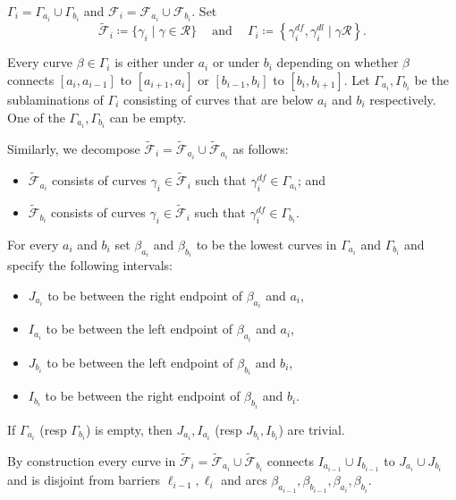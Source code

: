\documentclass{amsart}
\renewcommand{\sp}{{\ \ }}
\newcommand{\1}{{\mathbb 1 }}
\newcommand{\Fam}{{\mathcal F}}
\newcommand\RR{\mathcal{R}}
\theoremstyle{remark}
\numberwithin{equation}{section}
\theoremstyle{definition}
\begin{document}
 $\Gamma_i=\Gamma_{a_i}\cup \Gamma_{b_i}$ and $ \Fam_i=\Fam_{a_i}\cup \Fam_{b_i}$. Set 
\[ \widetilde \Fam_i \coloneqq\{\gamma_i\mid \gamma \in \RR\} \sp\sp \text{ and }\sp\sp \Gamma_i \coloneqq \left\{\gamma^{df}_i, \gamma^{dl}_i\mid \gamma\RR\right\} .\]

Every curve $\beta\in \Gamma_i$ is either under $a_i$ or under $b_i$ depending on whether $\beta$ connects $[a_i, a_{i-1}]$ to $[a_{i+1},a_{i}]$ or $[b_{i-1}, b_i]$ to $[b_i,b_{i+1}]$. Let $\Gamma_{a_i}, \Gamma_{b_i}$ be the sublaminations of $\Gamma_i$ consisting of curves that are below $a_i$ and $b_i$ respectively. One of the $\Gamma_{a_i}, \Gamma_{b_i}$ can be empty.

Similarly, we decompose $\widetilde \Fam_i=\widetilde \Fam_{a_i}\cup \widetilde \Fam_{a_i}$ as follows: 
\begin{itemize}
\item $\widetilde \Fam_{a_i}$ consists of curves $\gamma_i\in \widetilde \Fam_i$ such that $\gamma^{df}_i\in \Gamma_{a_i}$; and 
\item $\widetilde \Fam_{b_i}$ consists of curves $\gamma_i\in \widetilde \Fam_i$ such that $\gamma^{df}_i\in \Gamma_{b_i}$.
\end{itemize}

For every $a_i$ and $b_i$ set $\beta_{a_i}$ and $\beta_{b_i}$ to be the lowest curves in $\Gamma_{a_i}$ and $\Gamma_{b_i}$ and specify the following intervals: 
\begin{itemize}
\item $J_{a_i}$ to be  between the right endpoint of $\beta_{a_i}$ and $a_i$,
\item $I_{a_i}$ to be  between the left endpoint of $\beta_{a_i}$ and $a_i$,
\item $J_{b_i}$ to be  between the left endpoint of $\beta_{b_i}$ and $b_i$,
\item $I_{b_i}$ to be  between the right endpoint of $\beta_{b_i}$ and $b_i$.
\end{itemize} 
 If $\Gamma_{a_i}$ (resp $\Gamma_{b_i}$) is empty, then $J_{a_i}, I_{a_i}$ (resp $J_{b_i}, I_{b_i}$) are trivial. 
 
 By construction every curve in $\widetilde \Fam_i=\widetilde \Fam_{a_i}\cup \widetilde \Fam_{b_i}$ connects $I_{a_{i-1}}\cup I_{b_{i-1}}$ to $J_{a_i}\cup J_{b_i}$ and is disjoint from barriers $\ell_{i-1}, \ell_i$ and arcs $\beta_{a_{i-1}},\beta_{b_{i-1}},\beta_{a_i},\beta_{b_{i}}$.
 
\end{document}
